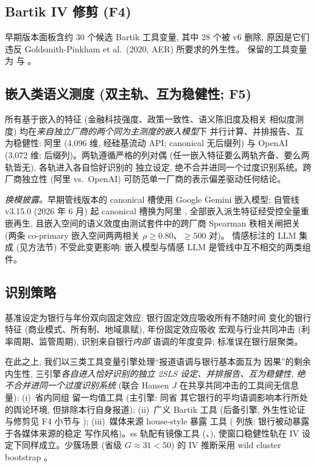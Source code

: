 \subsection{Bartik IV 修剪 (F4)}
早期版本面板含约 30 个候选 Bartik 工具变量, 其中 28 个被 v6 删除,
原因是它们违反 Goldsmith-Pinkham et al.\ (2020, AER) 所要求的外生性。
保留的工具变量为  与
。

\subsection{嵌入类语义测度 (双主轨、互为稳健性; F5)}
所有基于嵌入的特征 (金融科技强度、政策一致性、语义陈旧度及相关
相似度测度) 均在\emph{来自独立厂商的两个同为主测度的嵌入模型}下
并行计算、并排报告、互为稳健性: 阿里
 (4{,}096 维, 经硅基流动 API;
canonical 无后缀列) 与 OpenAI 
(3{,}072 维;  后缀列)。两轨遵循严格的列对偶
(任一嵌入特征要么两轨齐备、要么两轨皆无), 各轨进入各自恰好识别的
独立设定, 绝不合并进同一个过度识别系统。跨厂商独立性
(阿里 vs.\ OpenAI) 可防范单一厂商的表示偏差驱动任何结论。

\emph{换模披露。}早期管线版本的 canonical 槽使用 Google Gemini
嵌入模型; 自管线 v3.15.0 (2026 年 6 月) 起 canonical 槽换为阿里
, 全部嵌入派生特征经受控全量重嵌再生,
且嵌入空间的语义效度由测试套件中的跨厂商 Spearman 秩相关闸把关
(两条 co-primary 嵌入空间两两相关 $\rho \geq 0.80$、$\geq 500$ 对)。
情感标注的 LLM 集成
(见方法节) 不受此变更影响: 嵌入模型与情感 LLM
是管线中互不相交的两类组件。

\subsection{识别策略}\label{sec:ident}
基准设定为银行与年份双向固定效应: 银行固定效应吸收所有不随时间
变化的银行特征 (商业模式、所有制、地域禀赋), 年份固定效应吸收
宏观与行业共同冲击 (利率周期、监管周期), 识别来自银行\emph{内部}
语调的年度变异; 标准误在银行层聚类。

在此之上, 我们以三类工具变量引擎处理``报道语调与银行基本面互为
因果''的剩余内生性, 三引擎\emph{各自进入恰好识别的独立 2SLS
设定、并排报告、互为稳健性, 绝不合并进同一个过度识别系统}
(联合 Hansen $J$ 在共享共同冲击的工具间无信息量): (i)~省内同组
留一均值工具  (主引擎: 同省
其它银行的平均语调影响本行所处的舆论环境, 但排除本行自身报道);
(ii)~广义 Bartik 工具  (后备引擎,
外生性论证与修剪见 F4 小节与
\textcite{goldsmith2020bartik}); (iii)~媒体来源 house-style 暴露
工具 ( 列族: 银行被动暴露于各媒体来源的稳定
写作风格)。ss 轨配有镜像工具
(、),
使窗口稳健性轨在 IV 设定下同样成立。少簇场景 (省级 $G \approx
31 < 50$) 的 IV 推断采用 wild cluster bootstrap
\parencite{mackinnon2017wild, wang2024wildiv}。

